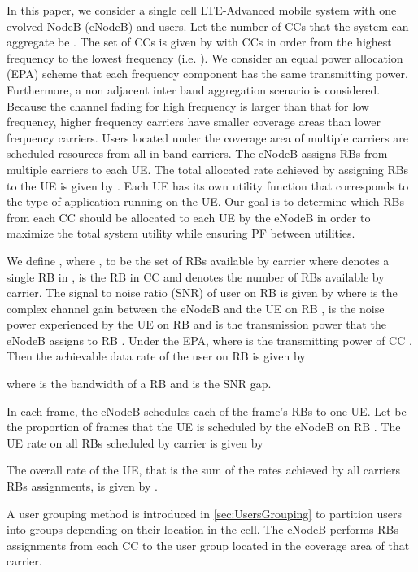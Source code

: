 \documentclass[conference]{IEEEtran}
\begin{document}
In this paper, we consider a single cell LTE-Advanced mobile system with one evolved NodeB (eNodeB) and  users. Let the number of CCs that the system can aggregate be . The set of CCs is given by   with CCs in order from the highest frequency to the lowest frequency (i.e. ). We consider an equal power allocation (EPA) scheme that each frequency component has the same transmitting power. Furthermore, a non adjacent inter band aggregation scenario is considered. Because the channel fading for high frequency is larger than that for low frequency, higher frequency carriers have smaller coverage areas than lower frequency carriers. Users located under the coverage area of multiple carriers are scheduled resources from all in band carriers. The eNodeB assigns RBs from multiple carriers to each UE. The total allocated rate achieved by assigning RBs to the  UE is given by . Each UE has its own utility function   that corresponds to the type of application running on the   UE. Our goal is to determine which RBs from each CC should be allocated to each UE by the eNodeB in order to maximize the total system utility while ensuring PF between utilities.

We define , where , to be the set of RBs available by  carrier where  denotes a single RB in ,  is the  RB in CC  and  denotes the number of RBs available by  carrier. The signal to noise ratio (SNR) of user  on RB  is given by 
where  is the complex channel gain between the eNodeB and the  UE on RB ,  is the noise power experienced by the  UE on RB  and  is the transmission power that the eNodeB assigns to RB . Under the EPA,  where  is the transmitting power of CC . Then the achievable data rate of the  user on RB  is given by
\vspace{-0.7em}

where  is the bandwidth of a RB and  is the SNR gap.

In each frame, the eNodeB schedules each of the frame's RBs to one UE. Let  be the proportion of frames that the  UE is scheduled by the eNodeB on RB . The  UE rate on all RBs scheduled by carrier  is given by


The overall rate of the  UE, that is the sum of the rates achieved by all carriers RBs assignments, is given by .


A user grouping method is introduced in \ref{sec:UsersGrouping} to partition users into groups depending on their location in the cell. The eNodeB performs RBs assignments from each CC to the user group located in the coverage area of that carrier.
\vspace{-0.5em}
\end{document}
